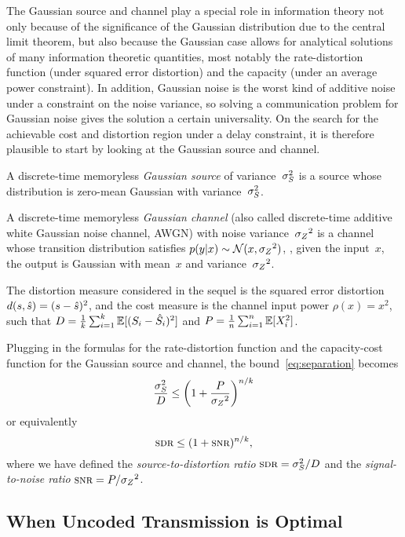 The Gaussian source and channel play a special role in information theory not
only because of the significance of the Gaussian distribution due to the central
limit theorem, but also because the Gaussian case allows for analytical
solutions of many information theoretic quantities, most notably the
rate-distortion function (under squared error distortion) and the capacity
(under an average power constraint). In addition, Gaussian noise is the worst
kind of additive noise under a constraint on the noise variance, so solving a
communication problem for Gaussian noise gives the solution a certain
universality. On the search for the achievable cost and distortion region under
a delay constraint, it is therefore plausible to start by looking at the
Gaussian source and channel. 

\begin{definition}
  \label{def:gaussiansc}
  A discrete-time memoryless \emph{Gaussian source} of variance~${\sigma_S^2}$ is a
  source whose distribution is zero-mean Gaussian with variance~${\sigma_S^2}$.

  A discrete-time memoryless \emph{Gaussian channel} (also called discrete-time
  additive white Gaussian noise channel, AWGN) with noise variance~${{\sigma_Z}^2}$ is a
  channel whose transition distribution satisfies $p(y|x) \sim \mathcal{N}(x, {{\sigma_Z}^2})$,
  \ie, given the input~$x$, the output is Gaussian with mean~$x$ and
  variance~${{\sigma_Z}^2}$.
\end{definition}

The distortion measure considered in the sequel is the squared error distortion
$d(s,{\hat{s}}) = (s - {\hat{s}})^2$, and the cost measure is the channel input power
$\rho(x) = x^2$, such that $D = \frac1k \sum_{i=1}^k \mathbb{E}[(S_i - {\hat{S}}_i)^2]$ and $P
= \frac1n \sum_{i=1}^n \mathbb{E}[X_i^2]$.

Plugging in the formulas for the rate-distortion function and the capacity-cost
function for the Gaussian source and channel, the bound~\eqref{eq:separation}
becomes
\begin{equation}
  \label{eq:gausssep}
  \frac{{\sigma_S^2}}{D} \le \left( 1 + \frac{P}{{{\sigma_Z}^2}} \right)^{n/k}
\end{equation}
or equivalently
\begin{equation}
  \label{eq:gausssepsdr}
  \sdr \le (1 + \snr)^{n/k},
\end{equation}
where we have defined the \emph{source-to-distortion ratio} $\sdr = \ssq/D$ and
the \emph{signal-to-noise ratio} $\snr = P/\szq$. 


\subsection{When Uncoded Transmission is Optimal}

